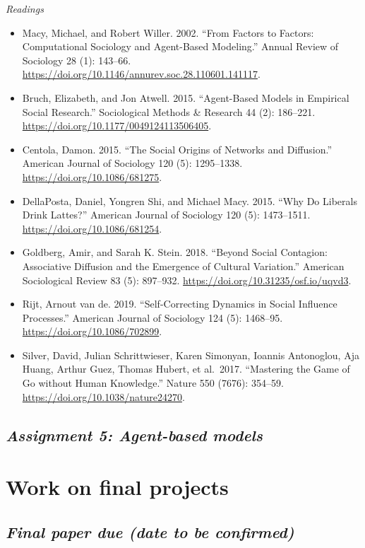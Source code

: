 \documentclass[
  10pt,
]{article}
\providecommand{\tightlist}{%
  \setlength{\itemsep}{0pt}\setlength{\parskip}{0pt}}
\begin{document}
\emph{Readings}

\begin{itemize}
\tightlist
\item
  Macy, Michael, and Robert Willer. 2002. ``From Factors to Factors:
  Computational Sociology and Agent-Based Modeling.'' Annual Review of
  Sociology 28 (1): 143--66.
  \url{https://doi.org/10.1146/annurev.soc.28.110601.141117}.
\item
  Bruch, Elizabeth, and Jon Atwell. 2015. ``Agent-Based Models in
  Empirical Social Research.'' Sociological Methods \& Research 44 (2):
  186--221. \url{https://doi.org/10.1177/0049124113506405}.
\item
  Centola, Damon. 2015. ``The Social Origins of Networks and
  Diffusion.'' American Journal of Sociology 120 (5): 1295--1338.
  \url{https://doi.org/10.1086/681275}.
\item
  DellaPosta, Daniel, Yongren Shi, and Michael Macy. 2015. ``Why Do
  Liberals Drink Lattes?'' American Journal of Sociology 120 (5):
  1473--1511. \url{https://doi.org/10.1086/681254}.
\item
  Goldberg, Amir, and Sarah K. Stein. 2018. ``Beyond Social Contagion:
  Associative Diffusion and the Emergence of Cultural Variation.''
  American Sociological Review 83 (5): 897--932.
  \url{https://doi.org/10.31235/osf.io/uqvd3}.
\item
  Rijt, Arnout van de. 2019. ``Self-Correcting Dynamics in Social
  Influence Processes.'' American Journal of Sociology 124 (5):
  1468--95. \url{https://doi.org/10.1086/702899}.
\item
  Silver, David, Julian Schrittwieser, Karen Simonyan, Ioannis
  Antonoglou, Aja Huang, Arthur Guez, Thomas Hubert, et al.~2017.
  ``Mastering the Game of Go without Human Knowledge.'' Nature 550
  (7676): 354--59. \url{https://doi.org/10.1038/nature24270}.
\end{itemize}

\hypertarget{assignment-5-agent-based-models}{%
\subsection{\texorpdfstring{\emph{Assignment 5: Agent-based
models}}{Assignment 5: Agent-based models}}\label{assignment-5-agent-based-models}}

\hypertarget{work-on-final-projects}{%
\section{Work on final projects}\label{work-on-final-projects}}

\hypertarget{final-paper-due-date-to-be-confirmed}{%
\subsection{\texorpdfstring{\emph{Final paper due (date to be
confirmed)}}{Final paper due (date to be confirmed)}}\label{final-paper-due-date-to-be-confirmed}}
\end{document}
